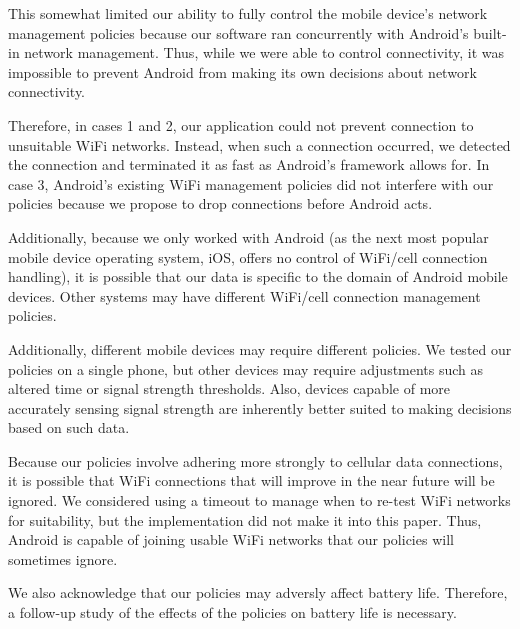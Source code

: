 This somewhat limited our ability to fully control the mobile device's network management policies because our software ran concurrently with Android's built-in network management. Thus, while we were able to control connectivity, it was impossible to prevent Android from making its own decisions about network connectivity.

Therefore, in cases 1 and 2, our application could not prevent connection to unsuitable WiFi networks. Instead, when such a connection occurred, we detected the connection and terminated it as fast as Android's framework allows for. In case 3, Android's existing WiFi management policies did not interfere with our policies because we propose to drop connections before Android acts.

Additionally, because we only worked with Android (as the next most popular mobile device operating system, iOS, offers no control of WiFi/cell connection handling), it is possible that our data is specific to the domain of Android mobile devices. Other systems may have different WiFi/cell connection management policies.

Additionally, different mobile devices may require different policies. We tested our policies on a single phone, but other devices may require adjustments such as altered time or signal strength thresholds. Also, devices capable of more accurately sensing signal strength are inherently better suited to making decisions based on such data.

Because our policies involve adhering more strongly to cellular data connections, it is possible that WiFi connections that will improve in the near future will be ignored. We considered using a timeout to manage when to re-test WiFi networks for suitability, but the implementation did not make it into this paper. Thus, Android is capable of joining usable WiFi networks that our policies will sometimes ignore.

We also acknowledge that our policies may adversly affect battery life. Therefore, a follow-up study of the effects of the policies on battery life is necessary.